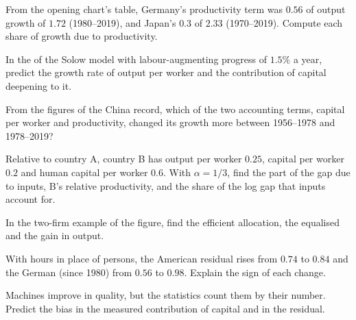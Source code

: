 \begin{exercise}[$\star$]\label{exo:b1:growth-accounting:read}
From the opening chart's table, Germany's productivity term was $0.56$ of
output growth of $1.72$ (1980--2019), and Japan's $0.3$ of $2.33$
(1970--2019). %
Compute each share of growth due to productivity.
\end{exercise}

\begin{exercise}[$\star$]\label{exo:b1:growth-accounting:steady}
In the  of the Solow model with labour-augmenting progress of
$1.5\%$ a year, predict the growth rate of output per worker and the
contribution of capital deepening to it.
\end{exercise}

\begin{exercise}[$\star$]\label{exo:b1:growth-accounting:china-ex}
From the figures of the China record, which of the two accounting terms,
capital per worker and productivity, changed its growth more between
1956--1978 and 1978--2019? %
\end{exercise}

\begin{exercise}[$\star\star$]\label{exo:b1:growth-accounting:levels-ex}
Relative to country A, country B has output per worker $0.25$, capital per
worker $0.2$ and human capital per worker $0.6$. With $\alpha = 1/3$, find the part of
the gap due to inputs, B's relative productivity, and the share of the
log gap that inputs account for.
\end{exercise}

\begin{exercise}[$\star\star$]\label{exo:b1:growth-accounting:two-firms}
In the two-firm example of the figure, find the efficient allocation, the
equalised  and the gain in output.
\end{exercise}

\begin{exercise}[$\star\star$]\label{exo:b1:growth-accounting:hours-ex}
With hours in place of persons, the American residual rises from $0.74$ to
$0.84$ and the German (since 1980) from $0.56$ to $0.98$. %
Explain the sign of each change.
\end{exercise}

\begin{exercise}[$\star\star$]\label{exo:b1:growth-accounting:quality}
Machines improve in quality, but the statistics count them by their
number. Predict the bias in the measured contribution of capital and in
the residual.
\end{exercise}

